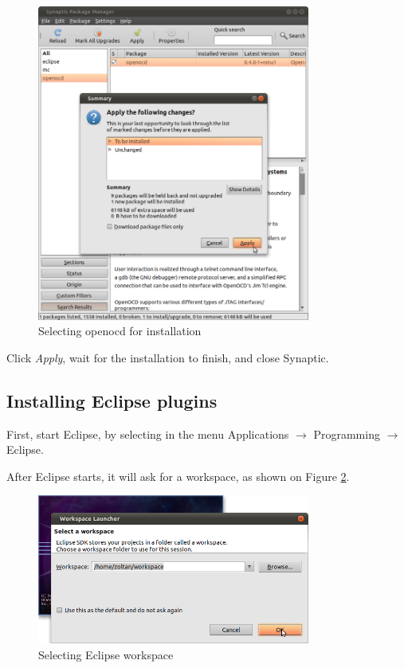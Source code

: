 \documentclass[a4paper, 10pt]{article}
\begin{document}
    \begin{figure}[H]
    \centering
        \includegraphics[width=0.8\textwidth]{./png-install-guide/synaptic-apply-changes.png}
        \caption{Selecting openocd for installation}
        \label{fig:synaptic-apply-changes.png}
    \end{figure}

Click \emph{Apply}, wait for the installation to finish, and close Synaptic.

\subsection{Installing Eclipse plugins}

First, start Eclipse, by selecting in the menu Applications $\rightarrow$
Programming $\rightarrow$ Eclipse.

After Eclipse starts, it will ask for a workspace, as shown on Figure \ref{fig:eclipse-workspace}.

    \begin{figure}[H]
    \centering
        \includegraphics[width=0.8\textwidth]{./png-install-guide/eclipse-workspace.png}
        \caption{Selecting Eclipse workspace}
        \label{fig:eclipse-workspace}
    \end{figure}
\end{document}
